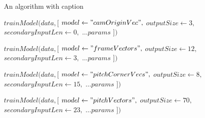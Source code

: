 \documentclass[
11pt,
twoside
]{report}
\begin{document}
\begin{algorithm}
\begin{algorithmic}


\caption{An algorithm with caption}\label{alg:cap}

\State

\State $trainModel( data, [$
    \State \indent $model \gets "camOriginVec",$
    \State \indent $outputSize \gets 3,$
    \State \indent $secondaryInputLen \gets 0,$
    \State \indent $\ldots params$
\State $] )$

\State

\State $trainModel( data, [$
    \State \indent $model \gets "frameVectors",$
    \State \indent $outputSize \gets 12,$
    \State \indent $secondaryInputLen \gets 3,$
    \State \indent $\ldots params$
\State $] )$

\State

\State $trainModel( data, [$
    \State \indent $model \gets "pitchCornerVecs",$
    \State \indent $outputSize \gets 8,$
    \State \indent $secondaryInputLen \gets 15,$
    \State \indent $\ldots params$
\State $] )$

\State

\State $trainModel( data, [$
    \State \indent $model \gets "pitchVectors",$
    \State \indent $outputSize \gets 70,$
    \State \indent $secondaryInputLen \gets 23,$
    \State \indent $\ldots params$
\State $] )$

\State


\end{algorithmic}
\end{algorithm}
\end{document}
